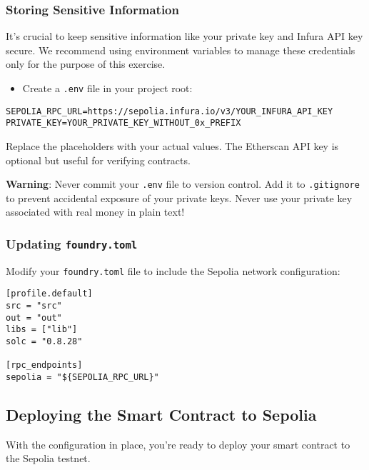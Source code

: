 \documentclass[12pt]{article}
\begin{document}
\subsubsection*{Storing Sensitive Information}

It’s crucial to keep sensitive information like your private key and Infura API key secure. We recommend using environment variables to manage these credentials only for the purpose of this exercise.

\begin{itemize}
    \item Create a \texttt{.env} file in your project root:
\end{itemize}

\begin{verbatim}
SEPOLIA_RPC_URL=https://sepolia.infura.io/v3/YOUR_INFURA_API_KEY
PRIVATE_KEY=YOUR_PRIVATE_KEY_WITHOUT_0x_PREFIX
\end{verbatim}

\medskip
\noindent
Replace the placeholders with your actual values. The Etherscan API key is optional but useful for verifying contracts.

\noindent
\medskip
\textbf{Warning}: Never commit your \texttt{.env} file to version control. Add it to \texttt{.gitignore} to prevent accidental exposure of your private keys. Never use your private key associated with real money in plain text!

\subsubsection*{Updating \texttt{foundry.toml}}

Modify your \texttt{foundry.toml} file to include the Sepolia network configuration:

\begin{verbatim}
[profile.default]
src = "src"
out = "out"
libs = ["lib"]
solc = "0.8.28"

[rpc_endpoints]
sepolia = "${SEPOLIA_RPC_URL}"
\end{verbatim}

\subsection{Deploying the Smart Contract to Sepolia}

With the configuration in place, you're ready to deploy your smart contract to the Sepolia testnet.
\end{document}
